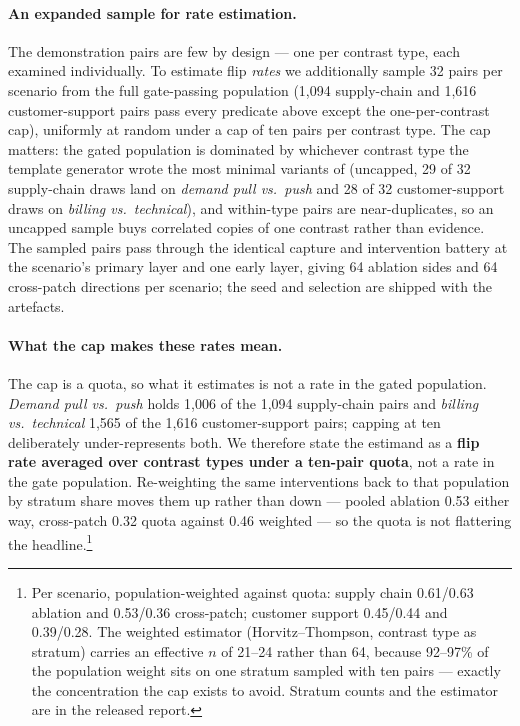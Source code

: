 \documentclass{article}
\begin{document}
\paragraph{An expanded sample for rate estimation.} The demonstration pairs are few by design --- one per contrast type, each examined individually. To estimate flip \emph{rates} we additionally sample 32 pairs per scenario from the full gate-passing population (1{,}094 supply-chain and 1{,}616 customer-support pairs pass every predicate above except the one-per-contrast cap), uniformly at random under a cap of ten pairs per contrast type. The cap matters: the gated population is dominated by whichever contrast type the template generator wrote the most minimal variants of (uncapped, 29 of 32 supply-chain draws land on \emph{demand pull vs.\ push} and 28 of 32 customer-support draws on \emph{billing vs.\ technical}), and within-type pairs are near-duplicates, so an uncapped sample buys correlated copies of one contrast rather than evidence. The sampled pairs pass through the identical capture and intervention battery at the scenario's primary layer and one early layer, giving 64 ablation sides and 64 cross-patch directions per scenario; the seed and selection are shipped with the artefacts.

\paragraph{What the cap makes these rates mean.} The cap is a quota, so what it estimates is not a rate in the gated population. \emph{Demand pull vs.\ push} holds 1{,}006 of the 1{,}094 supply-chain pairs and \emph{billing vs.\ technical} 1{,}565 of the 1{,}616 customer-support pairs; capping at ten deliberately under-represents both. We therefore state the estimand as a \textbf{flip rate averaged over contrast types under a ten-pair quota}, not a rate in the gate population. Re-weighting the same interventions back to that population by stratum share moves them up rather than down --- pooled ablation 0.53 either way, cross-patch 0.32 quota against 0.46 weighted --- so the quota is not flattering the headline.\footnote{Per scenario, population-weighted against quota: supply chain 0.61/0.63 ablation and 0.53/0.36 cross-patch; customer support 0.45/0.44 and 0.39/0.28. The weighted estimator (Horvitz--Thompson, contrast type as stratum) carries an effective $n$ of 21--24 rather than 64, because 92--97\% of the population weight sits on one stratum sampled with ten pairs --- exactly the concentration the cap exists to avoid. Stratum counts and the estimator are in the released report.}
\end{document}
